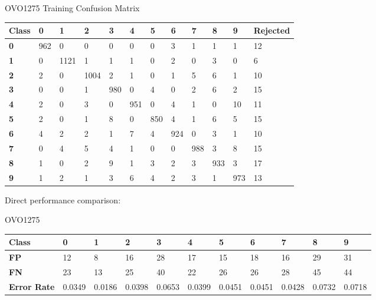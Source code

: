 \documentclass[
  a4paper,            %
  DIV=10,             %
  oneside,            %
  BCOR=5mm,           %
  parskip=half,       %
  numbers=noenddot,   %
  bibtotoc,           %
  listof=totoc,        %
  article
]{scrreprt}
\begin{document}
\begin{center}
  \small{OVO1275 Training Confusion Matrix}
  \begin{tabular}{|p{1cm}|p{1cm}|p{1cm}|p{1cm}|p{1cm}|p{1cm}|p{1cm}|p{1cm}|p{1cm}|p{1cm}|p{1cm}|p{1.7cm}|}
    \hline
    \textbf{Class} & \textbf{0} & \textbf{1} & \textbf{2} & \textbf{3} & \textbf{4} & \textbf{5} & \textbf{6} & \textbf{7} & \textbf{8} & \textbf{9} & \textbf{Rejected} \\
    \hline
    \textbf{0} & 962 & 0 & 0 & 0 & 0 & 0 & 3 & 1 & 1 & 1 & 12 \\
    \hline
    \textbf{1} & 0 & 1121 & 1 & 1 & 1 & 0 & 2 & 0 & 3 & 0 & 6 \\
    \hline
    \textbf{2} & 2 & 0 & 1004 & 2 & 1 & 0 & 1 & 5 & 6 & 1 & 10 \\
    \hline
    \textbf{3} & 0 & 0 & 1 & 980 & 0 & 4 & 0 & 2 & 6 & 2 & 15 \\
    \hline
    \textbf{4} & 2 & 0 & 3 & 0 & 951 & 0 & 4 & 1 & 0 & 10 & 11 \\
    \hline
    \textbf{5} & 2 & 0 & 1 & 8 & 0 & 850 & 4 & 1 & 6 & 5 & 15 \\
    \hline
    \textbf{6} & 4 & 2 & 2 & 1 & 7 & 4 & 924 & 0 & 3 & 1 & 10 \\
    \hline
    \textbf{7} & 0 & 4 & 5 & 4 & 1 & 0 & 0 & 988 & 3 & 8 & 15 \\
    \hline
    \textbf{8} & 1 & 0 & 2 & 9 & 1 & 3 & 2 & 3 & 933 & 3 & 17 \\
    \hline
    \textbf{9} & 1 & 2 & 1 & 3 & 6 & 4 & 2 & 3 & 1 & 973 & 13 \\
    \hline
  \end{tabular}
\end{center}

Direct performance comparison:

\begin{center}
  OVO1275
\end{center}

\begin{center}
  \begin{tabular}{|p{1cm}|p{1cm}|p{1cm}|p{1cm}|p{1cm}|p{1cm}|p{1cm}|p{1cm}|p{1cm}|p{1cm}|p{1cm}|}
    \hline
    \textbf{Class} & \textbf{0} & \textbf{1} & \textbf{2} & \textbf{3} & \textbf{4} & \textbf{5} & \textbf{6} & \textbf{7} & \textbf{8} & \textbf{9} \\
    \hline
    \textbf{FP} & 12 & 8 & 16 & 28 & 17 & 15 & 18 & 16 & 29 & 31 \\
    \hline
    \textbf{FN} & 23 & 13 & 25 & 40 & 22 & 26 & 26 & 28 & 45 & 44 \\
    \hline
    \textbf{Error Rate} & 0.0349 & 0.0186 & 0.0398 & 0.0653 & 0.0399 & 0.0451 & 0.0451 & 0.0428 & 0.0732 & 0.0718 \\
    \hline
  \end{tabular}
\end{center}
\end{document}
